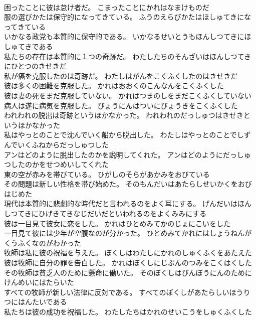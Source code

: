 \documentclass[8pt]{extreport}
\begin{document}
\begin{CJK}{UTF8}{min}
\\	困ったことに彼は怠け者だ。	こまったことにかれはなまけものだ 
\\	服の選びかたは保守的になってきている。	ふうのえらびかたはほしゅてきになってきている 
\\	いかなる政党も本質的に保守的である。	いかなるせいとうもほんしつてきにほしゅてきである 
\\	私たちの存在は本質的に１つの奇跡だ。	わたしたちのそんざいはほんしつてきにひとつのきせきだ 
\\	私が癌を克服したのは奇跡だ。	わたしはがんをこくふくしたのはきせきだ 
\\	彼は多くの困難を克服した。	かれはおおくのこんなんをこくふくした 
\\	彼は妻の死をまだ克服していない。	かれはつまのしをまだこくふくしていない 
\\	病人は遂に病気を克服した。	びょうにんはついにびょうきをこくふくした 
\\	われわれの脱出は奇跡というほかなかった。	われわれのだっしゅつはきせきというほかなかった 
\\	私はやっとのことで沈んでいく船から脱出した。	わたしはやっとのことでしずんでいくふねからだっしゅつした 
\\	アンはどのように脱出したのかを説明してくれた。	アンはどのようにだっしゅつしたのかをせつめいしてくれた 
\\	東の空が赤みを帯びている。	ひがしのそらがあかみをおびている 
\\	その問題は新しい性格を帯び始めた。	そのもんだいはあたらしせいかくをおびはじめた 
\\	現代は本質的に悲劇的な時代だと言われるのをよく耳にする。	げんだいはほんしつてきにひげきてきなじだいだといわれるのをよくみみにする 
\\	彼は一目見て彼女に恋をした。	かれはひとめみてかのじょにこいをした 
\\	一目見て彼には少年が空腹なのが分かった。	ひとめみてかれにはしょうねんがくうふくなのがわかった 
\\	牧師は私に彼の祝福を与えた。	ぼくしはわたしにかれのしゅくふくをあたえた 
\\	彼は牧師に自分の罪を告白した。	かれはぼくしにじぶんのつみをこくはくした 
\\	その牧師は貧乏人のために懸命に働いた。	そのぼくしはびんぼうにんのためにけんめいにはたらいた 
\\	すべての牧師が新しい法律に反対である。	すべてのぼくしがあたらしいほうりつにはんたいである 
\\	私たちは彼の成功を祝福した。	わたしたちはかれのせいこうをしゅくふくした 

\end{CJK}
\end{document}
